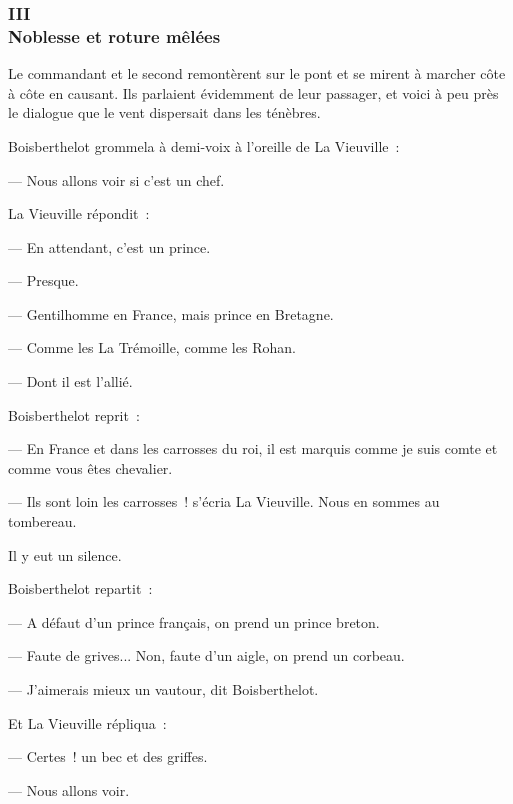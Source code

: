 \documentclass[french,twoside]{book} %
\begin{document}
 \subsubsection[{III. Noblesse et roture mêlées}]{III \\
Noblesse et roture mêlées}
\label{p1l2c3}
\noindent Le commandant et le second remontèrent sur le pont et se mirent à marcher côte à côte en causant. Ils parlaient évidemment de leur passager, et voici à peu près le dialogue que le vent dispersait dans les ténèbres.\par
Boisberthelot grommela à demi-voix à l’oreille de La Vieuville :\par
— Nous allons voir si c’est un chef.\par
La Vieuville répondit :\par
— En attendant, c’est un prince.\par
— Presque.\par
— Gentilhomme en France, mais prince en Bretagne.\par
— Comme les La Trémoille, comme les Rohan.\par
— Dont il est l’allié.\par
Boisberthelot reprit :\par
— En France et dans les carrosses du roi, il est marquis comme je suis comte et comme vous êtes chevalier.\par
— Ils sont loin les carrosses ! s’écria La Vieuville. Nous en sommes au tombereau.\par
 Il y eut un silence.\par
Boisberthelot repartit :\par
— A défaut d’un prince français, on prend un prince breton.\par
— Faute de grives... Non, faute d’un aigle, on prend un corbeau.\par
— J’aimerais mieux un vautour, dit Boisberthelot.\par
Et La Vieuville répliqua :\par
— Certes ! un bec et des griffes.\par
— Nous allons voir.\par
\end{document}

